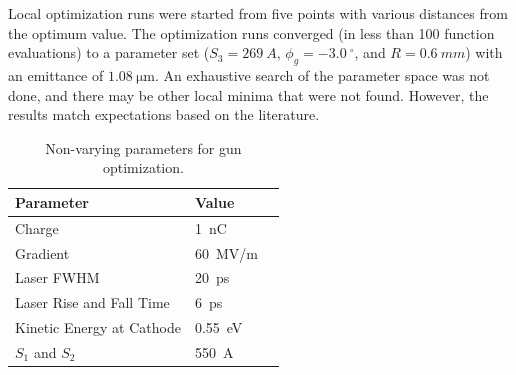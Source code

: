 Local optimization runs were started from five points with various distances from the optimum value. The optimization runs converged 
(in less than 100 function evaluations) to a parameter set ($S_3=\SI{269}{A}$, $\phi_g=\SI{-3.0}{^{\circ}}$, and $R=\SI{0.6}{mm}$) 
with an emittance of $\SI{1.08}{\um}$.
An exhaustive search of the parameter space was not done, and there may be other local minima that were not found.
However, the results match expectations based on the literature. 
\begin{table}[h] 
	\caption{\label{tab:gun} Non-varying parameters for gun optimization.}
	\begin{center}
		\begin{tabular}{lll}
			\toprule
			\textbf{Parameter} & \textbf{Value} \\
			\midrule
			Charge  & \SI{1}{nC} \\
			Gradient & \SI{60}{MV/m} \\
			Laser FWHM & \SI{20}{ps} \\
			Laser Rise and Fall Time & \SI{6}{ps} \\
			Kinetic Energy at Cathode  & \SI{0.55}{eV} \\
			$S_1$ and $S_2$ & \SI{550}{A} \\
			\bottomrule
		\end{tabular}
	\end{center}
\end{table}


